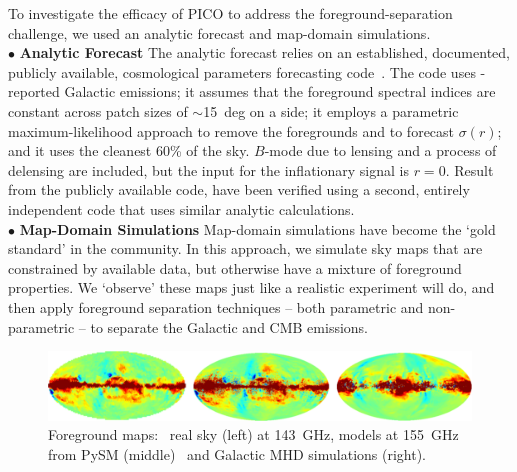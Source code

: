 \documentclass[PICOReport.tex]{subfiles}
\begin{document}
To investigate the efficacy of PICO to address the foreground-separation challenge, we used an analytic forecast and map-domain simulations. \\ 
%
\noindent$\bullet$ {\bf Analytic Forecast} \hspace{0.1in} The analytic forecast relies on an established, documented, publicly available, cosmological parameters forecasting code~\citep{errard_and_finney}. The code uses \planck -reported Galactic emissions; it assumes that the foreground spectral indices are constant across patch sizes of $\sim$15~deg on a side; it employs a parametric maximum-likelihood approach to remove the foregrounds and to forecast $\sigma(r)$; and it uses the cleanest 60\% of the sky. $B$-mode due to lensing and a process of delensing are included, but the input for the inflationary signal is $r=0$.  Result from the publicly available code, have been verified using a second, entirely independent code that uses similar analytic calculations.  
\\
%
\noindent$\bullet$ {\bf Map-Domain Simulations} \hspace{0.1in} Map-domain simulations have become the `gold standard' in the community. In this approach, we simulate sky maps that are constrained by available data, but otherwise have a mixture of foreground properties. We `observe' these maps just like a realistic experiment will do, and then apply foreground separation techniques -- both parametric and non-parametric -- to separate the Galactic and CMB emissions. 

\begin{figure}[t]
\begin{center}
\includegraphics[width=.95\textwidth]{images/foregrounds_maps_planck_models}
\vspace{-0.1in}
\caption{\captiontext
Foreground maps: \planck~real sky (left) at 143~GHz, models at 155~GHz from PySM (middle)~\citep{thorne2018_pysm} and Galactic MHD simulations (right). }
\label{fig:pysm_foregrounds}
\end{center}
\vspace{-0.2in}
\end{figure}
\end{document}
